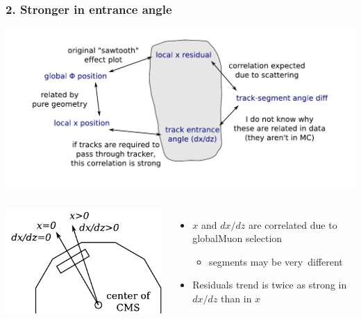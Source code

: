 \documentclass[compress]{beamer}
\begin{document}
\begin{frame}
\frametitle{2. Stronger in entrance angle}

\includegraphics[width=0.85\linewidth]{map_of_correlations3.pdf}

\vspace{-1 cm}
\begin{columns}

\includegraphics[width=0.5\linewidth]{trackangle_correlation.pdf}

\begin{itemize}
\item $x$ and $dx/dz$ are correlated due to globalMuon selection
\begin{itemize}
\item segments may be \mbox{very different\hspace{-1 cm}}
\end{itemize}
\item Residuals trend is twice as strong in $dx/dz$ than in $x$
\end{itemize}


\end{columns}
\end{frame}
\end{document}
